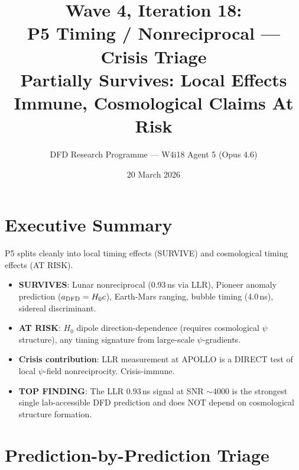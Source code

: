 \documentclass[11pt]{article}
\title{\textbf{Wave 4, Iteration 18:}\\
\textbf{P5 Timing / Nonreciprocal --- Crisis Triage}\\[6pt]
{\large Partially Survives: Local Effects Immune, Cosmological Claims At Risk}}
\author{DFD Research Programme --- W4i18 Agent 5 (Opus 4.6)}
\date{20 March 2026}
\begin{document}
\maketitle

\section*{Executive Summary}

\begin{tcolorbox}[colback=yellow!5!white, colframe=yellow!70!black,
  title=\textbf{W4i18: P5 PARTIALLY SURVIVES}]

P5 splits cleanly into local timing effects (SURVIVE) and cosmological
timing effects (AT RISK).

\begin{itemize}
\item \textbf{SURVIVES}: Lunar nonreciprocal (0.93\,ns via LLR), Pioneer
  anomaly prediction ($a_{\rm DFD} = H_0 c$), Earth-Mars ranging,
  bubble timing (4.0\,ns), sidereal discriminant.
\item \textbf{AT RISK}: $H_0$ dipole direction-dependence (requires
  cosmological $\psi$ structure), any timing signature from
  large-scale $\psi$-gradients.
\item \textbf{Crisis contribution}: LLR measurement at APOLLO is a
  DIRECT test of local $\psi$-field nonreciprocity. Crisis-immune.
\item \textbf{TOP FINDING}: The LLR 0.93\,ns signal at SNR $\sim 4000$
  is the strongest single lab-accessible DFD prediction and does NOT
  depend on cosmological structure formation.
\end{itemize}
\end{tcolorbox}

\section{Prediction-by-Prediction Triage}
\end{document}
